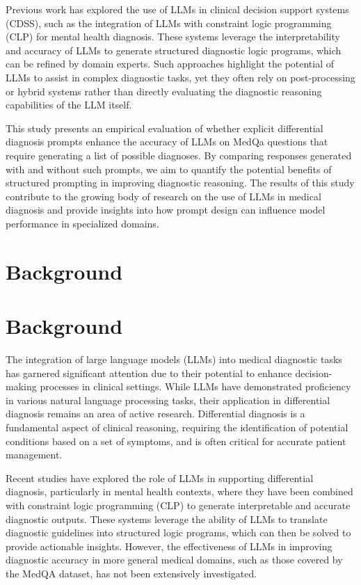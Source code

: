 \documentclass{article}
\begin{document}
Previous work has explored the use of LLMs in clinical decision support systems (CDSS), such as the integration of LLMs with constraint logic programming (CLP) for mental health diagnosis. These systems leverage the interpretability and accuracy of LLMs to generate structured diagnostic logic programs, which can be refined by domain experts. Such approaches highlight the potential of LLMs to assist in complex diagnostic tasks, yet they often rely on post-processing or hybrid systems rather than directly evaluating the diagnostic reasoning capabilities of the LLM itself.

This study presents an empirical evaluation of whether explicit differential diagnosis prompts enhance the accuracy of LLMs on MedQa questions that require generating a list of possible diagnoses. By comparing responses generated with and without such prompts, we aim to quantify the potential benefits of structured prompting in improving diagnostic reasoning. The results of this study contribute to the growing body of research on the use of LLMs in medical diagnosis and provide insights into how prompt design can influence model performance in specialized domains.
\section{Background}
\section{Background}

The integration of large language models (LLMs) into medical diagnostic tasks has garnered significant attention due to their potential to enhance decision-making processes in clinical settings. While LLMs have demonstrated proficiency in various natural language processing tasks, their application in differential diagnosis remains an area of active research. Differential diagnosis is a fundamental aspect of clinical reasoning, requiring the identification of potential conditions based on a set of symptoms, and is often critical for accurate patient management. 

Recent studies have explored the role of LLMs in supporting differential diagnosis, particularly in mental health contexts, where they have been combined with constraint logic programming (CLP) to generate interpretable and accurate diagnostic outputs. These systems leverage the ability of LLMs to translate diagnostic guidelines into structured logic programs, which can then be solved to provide actionable insights. However, the effectiveness of LLMs in improving diagnostic accuracy in more general medical domains, such as those covered by the MedQA dataset, has not been extensively investigated. 
\end{document}
